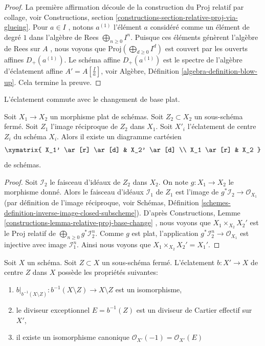 \begin{proof}
La première affirmation découle de la construction du Proj relatif par collage,
voir Constructions, section  \ref{constructions-section-relative-proj-via-glueing}. Pour  $a \in I$ , notons  $a^{(1)}$ 
l'élément  $a$  considéré comme un élément de degré  $1$  dans
l'algèbre de Rees  $\bigoplus_{n \geq 0} I^n$. Puisque ces éléments génèrent l'algèbre de Rees
sur  $A$ , nous voyons que  $\text{Proj}(\bigoplus_{d \geq 0} I^d)$  est couvert par les ouverts affines
 $D_{+}(a^{(1)})$. Le schéma affine  $D_{+}(a^{(1)})$  est le spectre de l'algèbre d'éclatement
affine  $A' = A[\frac{I}{a}]$, voir Algèbre, Définition  \ref{algebra-definition-blow-up}. Cela termine la
preuve.
\end{proof}

\begin{lemma}
\label{lemma-flat-base-change-blowing-up}
\begin{slogan}
L'éclatement commute avec le changement de base plat.
\end{slogan}
Soit  $X_1 \to X_2$  un morphisme plat de schémas. Soit  $Z_2 \subset X_2$  un sous-schéma
fermé. Soit  $Z_1$  l'image réciproque de  $Z_2$  dans  $X_1$.
Soit  $X'_i$  l'éclatement de centre  $Z_i$  du schéma  $X_i$. Alors il existe un
diagramme cartésien
$$
\xymatrix{
X_1' \ar[r] \ar[d] & X_2' \ar[d] \\
X_1 \ar[r] & X_2
}
$$
de schémas.
\end{lemma}

\begin{proof}
Soit  $\mathcal{I}_2$  le faisceau d'idéaux de  $Z_2$  dans  $X_2$. On note
 $g : X_1 \to X_2$  le morphisme donné. Alors le faisceau d'idéaux  $\mathcal{I}_1$  de
 $Z_1$  est l'image de  $g^*\mathcal{I}_2 \to \mathcal{O}_{X_1}$  (par définition de l'image réciproque,
voir Schémas, Définition  \ref{schemes-definition-inverse-image-closed-subscheme}). D'après Constructions, Lemme  \ref{constructions-lemma-relative-proj-base-change} ,
nous voyons que  $X_1 \times_{X_2} X_2'$  est le Proj relatif de  $\bigoplus_{n \geq 0} g^*\mathcal{I}_2^n$. Comme
 $g$  est plat, l'application  $g^*\mathcal{I}_2^n \to \mathcal{O}_{X_1}$  est injective avec image
 $\mathcal{I}_1^n$. Ainsi nous voyons que  $X_1 \times_{X_2} X_2' = X_1'$.
\end{proof}

\begin{lemma}
\label{lemma-blowing-up-gives-effective-Cartier-divisor}
Soit  $X$  un schéma. Soit  $Z \subset X$  un sous-schéma fermé. L'éclatement
 $b : X' \to X$  de centre  $Z$  dans  $X$  possède les propriétés suivantes:
\begin{enumerate}
\item $b|_{b^{-1}(X \setminus Z)} : b^{-1}(X \setminus Z) \to X \setminus Z$  est un isomorphisme,
\item le diviseur exceptionnel  $E = b^{-1}(Z)$  est un diviseur de Cartier effectif sur
 $X'$,
\item il existe un isomorphisme canonique  $\mathcal{O}_{X'}(-1) = \mathcal{O}_{X'}(E)$
\end{enumerate}
\end{lemma}

